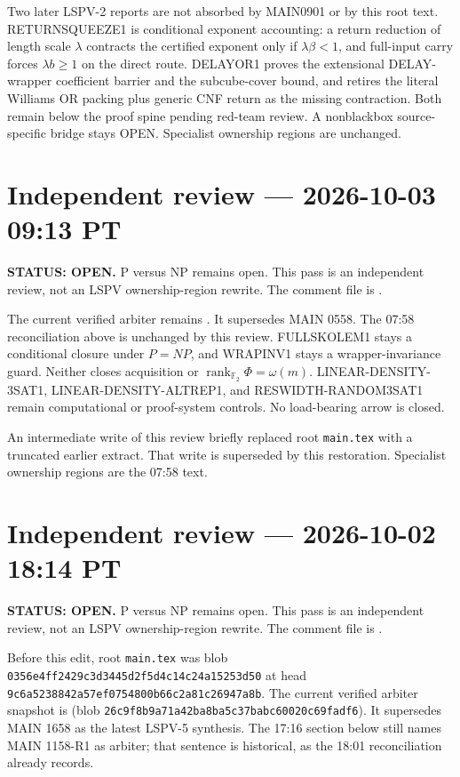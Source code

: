 \documentclass[11pt]{article}
\begin{document}
Two later LSPV-2 reports are not absorbed by MAIN0901 or by this root text.
RETURNSQUEEZE1 is conditional exponent accounting: a return reduction of length scale
\(\lambda\) contracts the certified exponent only if \(\lambda\beta<1\), and full-input
carry forces \(\lambda b\ge 1\) on the direct route. DELAYOR1 proves the extensional
DELAY-wrapper coefficient barrier and the subcube-cover bound, and retires the literal
Williams OR packing plus generic CNF return as the missing contraction. Both remain below
the proof spine pending red-team review. A nonblackbox source-specific bridge stays OPEN.
Specialist ownership regions are unchanged.

\section{Independent review --- 2026-10-03 09:13 PT}
\textbf{STATUS: OPEN.} P versus NP remains open. This pass is an independent review, not an
LSPV ownership-region rewrite. The comment file is
.

The current verified arbiter remains
.
It supersedes MAIN 0558. The 07:58 reconciliation above is unchanged by this review.
FULLSKOLEM1 stays a conditional closure under \(P=NP\), and WRAPINV1 stays a
wrapper-invariance guard. Neither closes acquisition or
\(\operatorname{rank}_{\mathbb F_2}\Phi=\omega(m)\).
LINEAR-DENSITY-3SAT1, LINEAR-DENSITY-ALTREP1, and RESWIDTH-RANDOM3SAT1 remain
computational or proof-system controls. No load-bearing arrow is closed.

An intermediate write of this review briefly replaced root \texttt{main.tex} with a
truncated earlier extract. That write is superseded by this restoration. Specialist
ownership regions are the 07:58 text.

\section{Independent review --- 2026-10-02 18:14 PT}
\textbf{STATUS: OPEN.} P versus NP remains open. This pass is an independent review, not an
LSPV ownership-region rewrite. The comment file is
.

Before this edit, root \texttt{main.tex} was blob \texttt{0356e4ff2429c3d3445d2f5d4c14c24a15253d50}
at head \texttt{9c6a5238842a57ef0754800b66c2a81c26947a8b}.
The current verified arbiter snapshot is
(blob \texttt{26c9f8b9a71a42ba8ba5c37babc60020c69fadf6}).
It supersedes MAIN 1658 as the latest LSPV-5 synthesis. The 17:16 section below still names
MAIN 1158-R1 as arbiter; that sentence is historical, as the 18:01 reconciliation already records.
\end{document}
